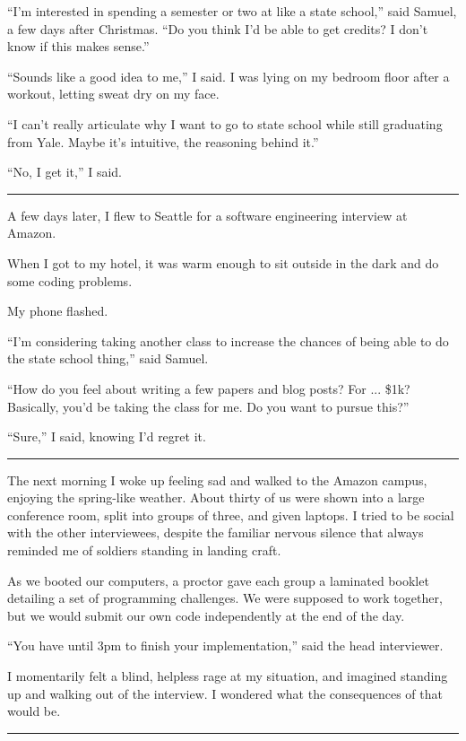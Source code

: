 ``I'm interested in spending a semester or two at like a state school,'' said
Samuel, a few days after Christmas.  ``Do you think I'd be able to get credits?
I don't know if this makes sense.''

``Sounds like a good idea to me,'' I said.  I was lying on my bedroom floor
after a workout, letting sweat dry on my face.

``I can't really articulate why I want to go to state school while still
graduating from Yale.   Maybe it's intuitive, the reasoning behind it.'' 

``No, I get it,'' I said. 

\plainfancybreak{12pt}{2}{* * *}

A few days later, I flew to Seattle for a software engineering interview at
Amazon.

When I got to my hotel, it was warm enough to sit outside in the dark and do
some coding problems.

My phone flashed.

``I'm considering taking another class to increase the chances of being able to
do the state school thing,'' said Samuel.  

``How do you feel about writing a few papers and blog posts?  For ... \$1k?
Basically, you'd be taking the class for me.  Do you want to pursue this?'' 

``Sure,'' I said, knowing I'd regret it.

\plainfancybreak{12pt}{2}{* * *}

The next morning I woke up feeling sad and walked to the Amazon campus, enjoying
the spring-like weather.  About thirty of us were shown into a large conference
room, split into groups of three, and given laptops.  I tried to be social with
the other interviewees, despite the familiar nervous silence that always
reminded me of soldiers standing in landing craft.

As we booted our computers, a proctor gave each group a laminated booklet
detailing a set of programming challenges.  We were supposed to work together,
but we would submit our own code independently at the end of the day.

``You have until 3pm to finish your implementation,'' said the head interviewer.

I momentarily felt a blind, helpless rage at my situation, and imagined standing
up and walking out of the interview.  I wondered what the consequences of that
would be.  

\plainfancybreak{12pt}{2}{* * *}

